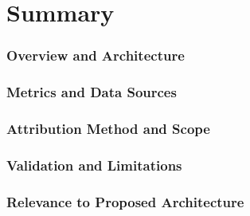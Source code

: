 \section{Summary}
\label{sec:tool-summary}




\subsubsection{Overview and Architecture}
\subsubsection{Metrics and Data Sources}
\subsubsection{Attribution Method and Scope}
\subsubsection{Validation and Limitations}
\subsubsection{Relevance to Proposed Architecture}



